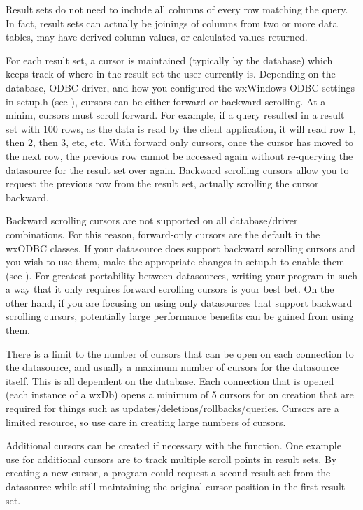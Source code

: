Result sets do not need to include all columns of every row matching the 
query.  In fact, result sets can actually be joinings of columns from two 
or more data tables, may have derived column values, or calculated values 
returned.

For each result set, a cursor is maintained (typically by the database) 
which keeps track of where in the result set the user currently is.  
Depending on the database, ODBC driver, and how you configured the 
wxWindows ODBC settings in setup.h (see ), cursors can be 
either forward or backward scrolling.  At a minim, cursors must scroll 
forward.  For example, if a query resulted in a result set with 100 rows, 
as the data is read by the client application, it will read row 1, then 2, 
then 3, etc, etc.  With forward only cursors, once the cursor has moved to 
the next row, the previous row cannot be accessed again without re-querying 
the datasource for the result set over again.  Backward scrolling cursors 
allow you to request the previous row from the result set, actually 
scrolling the cursor backward.

Backward scrolling cursors are not supported on all database/driver 
combinations.  For this reason, forward-only cursors are the default in 
the wxODBC classes.  If your datasource does support backward scrolling 
cursors and you wish to use them, make the appropriate changes in setup.h 
to enable them (see ).  For greatest portability between 
datasources, writing your program in such a way that it only requires 
forward scrolling cursors is your best bet.  On the other hand, if you are 
focusing on using only datasources that support backward scrolling cursors, 
potentially large performance benefits can be gained from using them.

There is a limit to the number of cursors that can be open on each connection 
to the datasource, and usually a maximum number of cursors for the datasource 
itself.  This is all dependent on the database.  Each connection that is 
opened (each instance of a wxDb) opens a minimum of 5 cursors for on creation 
that are required for things such as updates/deletions/rollbacks/queries.  
Cursors are a limited resource, so use care in creating large numbers of 
cursors.

Additional cursors can be created if necessary with the 
 function.  One example 
use for additional cursors are to track multiple scroll points in result 
sets.  By creating a new cursor, a program could request a second result set 
from the datasource while still maintaining the original cursor position in 
the first result set.

